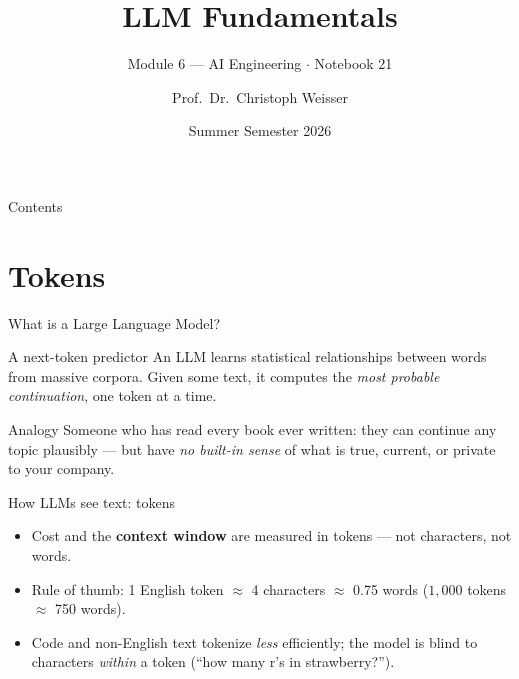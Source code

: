 \documentclass[aspectratio=169,11pt]{beamer}
\title{LLM Fundamentals}
\subtitle{Module 6 --- AI Engineering $\cdot$ Notebook 21}
\author{Prof.\ Dr.\ Christoph Weisser}
\institute{HSBI}
\date{Summer Semester 2026}
\begin{document}
\begin{frame}\titlepage\end{frame}

\begin{frame}{Contents}
  \tableofcontents[hideallsubsections]
\end{frame}

\section{Tokens}
\begin{frame}{What is a Large Language Model?}
  \begin{block}{A next-token predictor}
    An LLM learns statistical relationships between words from massive corpora. Given some text, it computes the \emph{most probable continuation}, one token at a time.
  \end{block}
  \begin{exampleblock}{Analogy}
    Someone who has read every book ever written: they can continue any topic plausibly --- but have \emph{no built-in sense} of what is true, current, or private to your company.
  \end{exampleblock}
\end{frame}

\begin{frame}{How LLMs see text: tokens}
  \begin{center}
  \end{center}
  \begin{itemize}
    \item Cost and the \textbf{context window} are measured in tokens --- not characters, not words.
    \item Rule of thumb: 1 English token $\approx$ 4 characters $\approx$ 0.75 words ($1{,}000$ tokens $\approx$ 750 words).
    \item Code and non-English text tokenize \emph{less} efficiently; the model is blind to characters \emph{within} a token (``how many r's in strawberry?'').
  \end{itemize}
\end{frame}
\end{document}
